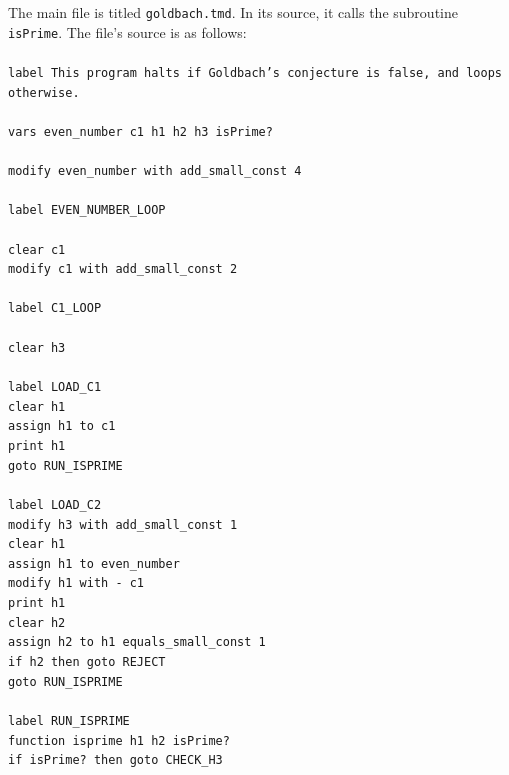 The main file is titled \texttt{goldbach.tmd}. In its source, it calls the subroutine \texttt{isPrime}. The file's source is as follows: \\ \\
{\tt label This program halts if Goldbach's conjecture is false, and loops otherwise. \\ \\
vars even\_number c1 h1 h2 h3 isPrime? \\ \\
modify even\_number with add\_small\_const 4 \\ \\
label EVEN\_NUMBER\_LOOP \\ \\ 
\indent	clear c1 \\ 
\indent	modify c1 with add\_small\_const 2 \\ \\
\indent	label C1\_LOOP \\ \\
\indent \indent	clear h3 \\ \\		
\indent \indent	label LOAD\_C1 \\
\indent \indent	clear h1 \\
\indent \indent	assign h1 to c1 \\
\indent \indent print h1 \\
\indent \indent	goto RUN\_ISPRIME \\ \\
\indent \indent	label LOAD\_C2 \\
\indent \indent	modify h3 with add\_small\_const 1 \\
\indent \indent	clear h1 \\
\indent \indent	assign h1 to even\_number \\
\indent \indent	modify h1 with - c1 \\
\indent \indent	print h1 \\
\indent \indent	clear h2 \\
\indent \indent	assign h2 to h1 equals\_small\_const 1 \\
\indent \indent	if h2 then goto REJECT \\
\indent \indent	goto RUN\_ISPRIME \\ \\
\indent \indent	label RUN\_ISPRIME \\
\indent \indent	function isprime h1 h2 isPrime? \\
\indent \indent	if isPrime? then goto CHECK\_H3 \\
}
